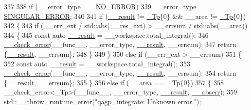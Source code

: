 \begin{DoxyCode}
337 
338           \textcolor{keywordflow}{if} (\_\_error\_type == \hyperlink{namespace____gnu__cxx_ad6c62dd86a596716cece6ac2d4cfd4b3ac31eecc280b10dec2efb4a2216ccc2e0}{NO\_ERROR})
339             \_\_error\_type = \hyperlink{namespace____gnu__cxx_ad6c62dd86a596716cece6ac2d4cfd4b3a8e955ea89d59c116d92f16f345620d04}{SINGULAR\_ERROR};
340 
341           \textcolor{keywordflow}{if} (\hyperlink{namespace____gnu__cxx_a500ea9f53aeaecd8c2ae657503450578}{\_\_result} != \hyperlink{namespace____gnu__cxx_a3b19a9c800ca194374ef9172290f7d79}{\_Tp}\{0\} && \_\_area != \hyperlink{namespace____gnu__cxx_a3b19a9c800ca194374ef9172290f7d79}{\_Tp}\{0\})
342             \{
343               \textcolor{keywordflow}{if} (\_\_err\_ext / std::abs(\_\_res\_ext) > \_\_errsum / std::abs(\_\_area))
344                 \{
345                   \textcolor{keyword}{const} \textcolor{keyword}{auto} \hyperlink{namespace____gnu__cxx_a500ea9f53aeaecd8c2ae657503450578}{\_\_result} = \_\_workspace.total\_integral();
346                   \hyperlink{namespace____gnu__cxx_a370fd142548c2e9e39e69282b4603317}{\_\_check\_error}(\_\_func\_\_, \_\_error\_type, \hyperlink{namespace____gnu__cxx_a500ea9f53aeaecd8c2ae657503450578}{\_\_result}, \_\_errsum);
347                   \textcolor{keywordflow}{return} \{\hyperlink{namespace____gnu__cxx_a500ea9f53aeaecd8c2ae657503450578}{\_\_result}, \_\_errsum\};
348                 \}
349             \}
350           \textcolor{keywordflow}{else} \textcolor{keywordflow}{if} (\_\_err\_ext > \_\_errsum)
351             \{
352               \textcolor{keyword}{const} \textcolor{keyword}{auto} \hyperlink{namespace____gnu__cxx_a500ea9f53aeaecd8c2ae657503450578}{\_\_result} = \_\_workspace.total\_integral();
353               \hyperlink{namespace____gnu__cxx_a370fd142548c2e9e39e69282b4603317}{\_\_check\_error}(\_\_func\_\_, \_\_error\_type, \hyperlink{namespace____gnu__cxx_a500ea9f53aeaecd8c2ae657503450578}{\_\_result}, \_\_errsum);
354               \textcolor{keywordflow}{return} \{\hyperlink{namespace____gnu__cxx_a500ea9f53aeaecd8c2ae657503450578}{\_\_result}, \_\_errsum\};
355             \}
356           \textcolor{keywordflow}{else} \textcolor{keywordflow}{if} (\_\_area == \hyperlink{namespace____gnu__cxx_a3b19a9c800ca194374ef9172290f7d79}{\_Tp}\{0\})
357             \{
358               \_\_check\_error<\_Tp>(\_\_func\_\_, \_\_error\_type, \hyperlink{namespace____gnu__cxx_a500ea9f53aeaecd8c2ae657503450578}{\_\_result}, 
      \hyperlink{namespace____gnu__cxx_a72f736cff127f1574e91a301de9e074b}{\_\_abserr});
359               std::\_\_throw\_runtime\_error(\textcolor{stringliteral}{"qagp\_integrate: Unknown error."});

\end{DoxyCode}
